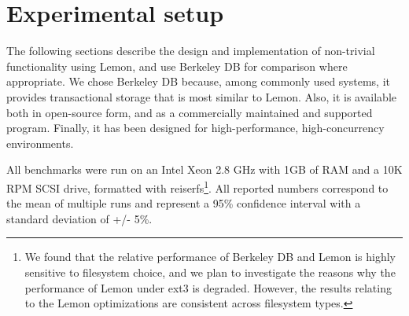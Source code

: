 \documentclass[letterpaper,twocolumn,english]{article}
\newcommand{\yad}{Lemon\xspace}
\begin{document}
%










\section{Experimental setup}
\label{sec:experimental_setup}

The following sections describe the design and implementation of
non-trivial functionality using \yad, and use Berkeley DB for
comparison where appropriate.  We chose Berkeley DB because, among
commonly used systems, it provides transactional storage that is most
similar to \yad.  Also, it is available both in open-source form, and as a
commercially maintained and supported program.  Finally, it has been 
designed for high-performance, high-concurrency environments.

All benchmarks were run on an Intel Xeon 2.8 GHz with 1GB of RAM and a
10K RPM SCSI drive, formatted with reiserfs\footnote{We found that
the relative performance of Berkeley DB and \yad is highly sensitive
to filesystem choice, and we plan to investigate the reasons why the
performance of \yad under ext3 is degraded. However, the results
relating to the \yad optimizations are consistent across filesystem
types.}.
All reported numbers
correspond to the mean of multiple runs and represent a 95\%
confidence interval with a standard deviation of +/- 5\%.
\end{document}
